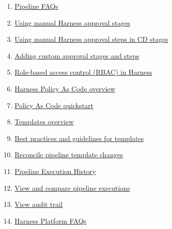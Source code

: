 \documentclass[11pt]{article}
\begin{document}
{\begin{enumerate}[leftmargin=1.5em,itemsep=0.2em]
  \item \href{https://developer.harness.io/docs/platform/pipeline-faq/}{Pipeline FAQs}
  \item \href{https://developer.harness.io/docs/platform/approvals/adding-harness-approval-stages}{Using manual Harness approval stages}
  \item \href{https://developer.harness.io/docs/continuous-delivery/x-platform-cd-features/cd-steps/approvals/using-harness-approval-steps-in-cd-stages}{Using manual Harness approval steps in CD stages}
  \item \href{https://developer.harness.io/docs/platform/approvals/custom-approvals}{Adding custom approval stages and steps}
  \item \href{https://developer.harness.io/docs/platform/role-based-access-control/rbac-in-harness/}{Role-based access control (RBAC) in Harness}
  \item \href{https://developer.harness.io/docs/platform/governance/policy-as-code/harness-governance-overview}{Harness Policy As Code overview}
  \item \href{https://developer.harness.io/docs/platform/governance/policy-as-code/harness-governance-quickstart/}{Policy As Code quickstart}
  \item \href{https://developer.harness.io/docs/platform/templates/template}{Templates overview}
  \item \href{https://developer.harness.io/docs/platform/templates/templates-best-practices}{Best practices and guidelines for templates}
  \item \href{https://developer.harness.io/docs/platform/templates/reconcile-pipeline-templates/}{Reconcile pipeline template changes}
  \item \href{https://developer.harness.io/docs/continuous-delivery/x-platform-cd-features/executions/execution-history}{Pipeline Execution History}
  \item \href{https://developer.harness.io/docs/platform/pipelines/executions-and-logs/view-and-compare-pipeline-executions}{View and compare pipeline executions}
  \item \href{https://developer.harness.io/docs/platform/governance/audit-trail/}{View audit trail}
  \item \href{https://developer.harness.io/docs/platform/harness-platform-faqs}{Harness Platform FAQs}
\end{enumerate}
}
\end{document}
